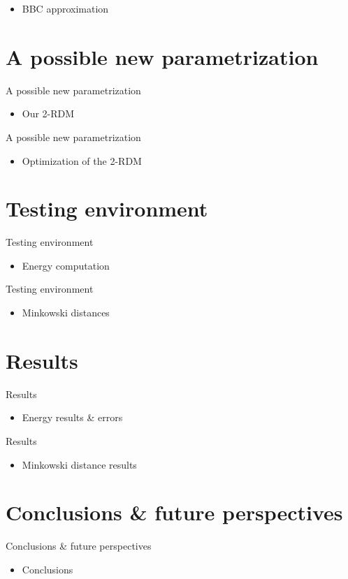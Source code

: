 \begin{frame}{\sec}
    \begin{itemize}
        \item BBC approximation
    \end{itemize}
\end{frame}

\renewcommand{\sec}{A possible new parametrization}
\section{\sec}
\begin{frame}{\sec}
    \begin{itemize}
        \item Our 2-RDM
    \end{itemize}
\end{frame}

\begin{frame}{\sec}
    \begin{itemize}
        \item Optimization of the 2-RDM
    \end{itemize}
\end{frame}

\renewcommand{\sec}{Testing environment}
\section{\sec}
\begin{frame}{\sec}
    \begin{itemize}
        \item Energy computation
    \end{itemize}
\end{frame}

\begin{frame}{\sec}
    \begin{itemize}
        \item Minkowski distances
    \end{itemize}
\end{frame}

\renewcommand{\sec}{Results}
\section{\sec}
\begin{frame}{\sec}
    \begin{itemize}
        \item Energy results \& errors
    \end{itemize}
\end{frame}

\begin{frame}{\sec}
    \begin{itemize}
        \item Minkowski distance results
    \end{itemize}
\end{frame}

\renewcommand{\sec}{Conclusions \& future perspectives}
\section{\sec}
\begin{frame}{\sec}
    \begin{itemize}
        \item Conclusions
    \end{itemize}
\end{frame}
